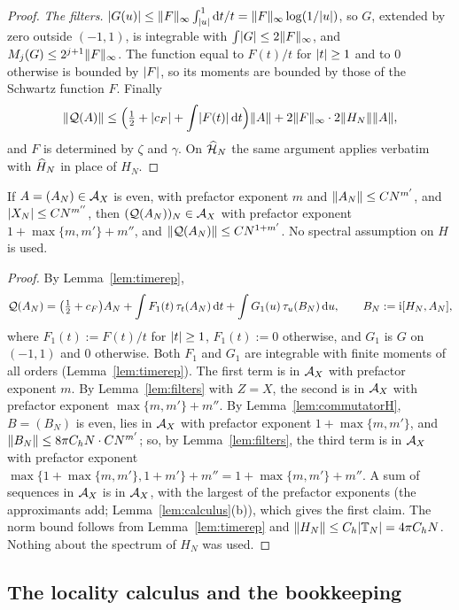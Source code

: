 \begin{proof}
\emph{The filters.} $\lvert G(u)\rvert\le\lVert F\rVert_\infty\int_{\lvert u\rvert}^1\mathrm{d} t/t=\lVert F\rVert_\infty\log(1/\lvert u\rvert)$, so $G$, extended by
zero outside $(-1,1)$, is integrable with $\int\lvert G\rvert\le2\lVert F\rVert_\infty$, and $M_j(G)\le2^{j+1}\lVert F\rVert_\infty$. The function
equal to $F(t)/t$ for $\lvert t\rvert\ge1$ and to $0$ otherwise is bounded by $\lvert F\rvert$, so its moments are bounded by those of
the Schwartz function $F$. Finally
\[
\lVert\mathcal{Q}(A)\rVert\le\Bigl(\tfrac12+\lvert c_F\rvert+\int\lvert F(t)\rvert\,\mathrm{d} t\Bigr)\lVert A\rVert+2\lVert F\rVert_\infty\cdot2\lVert H_N\rVert\lVert A\rVert,
\]
and $F$ is determined by $\zeta$ and $\gamma$. On $\widehat{\mathcal{H}}_N$ the same argument applies verbatim with $\widehat{H}_N$ in place of
$H_N$.
\end{proof}

\begin{proposition}\label{prop:Qlocal}
If $A=(A_N)\in\mathcal{A}_X$ is even, with prefactor exponent $m$ and $\lVert A_N\rVert\le CN^{m'}$, and $\lvert X_N\rvert\le CN^{m''}$,
then $(\mathcal{Q}(A_N))_N\in\mathcal{A}_X$ with prefactor exponent $1+\max\{m,m'\}+m''$, and $\lVert\mathcal{Q}(A_N)\rVert\le CN^{1+m'}$. No
spectral assumption on $H$ is used.
\end{proposition}

\begin{proof}
By Lemma~\ref{lem:timerep},
\[
\mathcal{Q}(A_N)=\bigl(\tfrac12+c_F\bigr)A_N+\int F_1(t)\,\tau_t(A_N)\,\mathrm{d} t+\int G_1(u)\,\tau_u(B_N)\,\mathrm{d} u,\qquad B_N:=\mathrm{i}[H_N,A_N],
\]
where $F_1(t):=F(t)/t$ for $\lvert t\rvert\ge1$, $F_1(t):=0$ otherwise, and $G_1$ is $G$ on $(-1,1)$ and $0$ otherwise. Both
$F_1$ and $G_1$ are integrable with finite moments of all orders (Lemma~\ref{lem:timerep}). The first term is in
$\mathcal{A}_X$ with prefactor exponent $m$. By Lemma~\ref{lem:filters} with $Z=X$, the second is in $\mathcal{A}_X$ with prefactor
exponent $\max\{m,m'\}+m''$. By Lemma~\ref{lem:commutatorH}, $B=(B_N)$ is even, lies in $\mathcal{A}_X$ with prefactor exponent
$1+\max\{m,m'\}$, and $\lVert B_N\rVert\le8\pi C_hN\cdot CN^{m'}$; so, by Lemma~\ref{lem:filters}, the third term is in $\mathcal{A}_X$
with prefactor exponent $\max\{1+\max\{m,m'\},1+m'\}+m''=1+\max\{m,m'\}+m''$. A sum of sequences in $\mathcal{A}_X$ is in
$\mathcal{A}_X$, with the largest of the prefactor exponents (the approximants add; Lemma~\ref{lem:calculus}(b)), which gives
the first claim. The norm bound follows from Lemma~\ref{lem:timerep} and $\lVert H_N\rVert\le C_h\lvert\mathbb{T}_N\rvert=4\pi C_hN$.
Nothing about the spectrum of $H_N$ was used.
\end{proof}

\subsection{The locality calculus and the bookkeeping}

